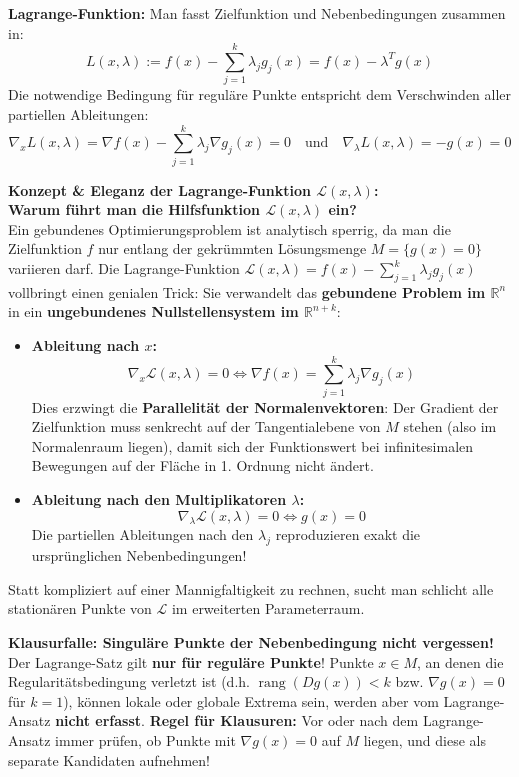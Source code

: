 \begin{definition}
    \textbf{Lagrange-Funktion:} Man fasst Zielfunktion und Nebenbedingungen zusammen in:
    $$ L(x, \lambda) := f(x) - \sum_{j=1}^k \lambda_j g_j(x) = f(x) - \lambda^T g(x) $$
    Die notwendige Bedingung für reguläre Punkte entspricht dem Verschwinden aller partiellen Ableitungen:
    $$ \nabla_x L(x, \lambda) = \nabla f(x) - \sum_{j=1}^k \lambda_j \nabla g_j(x) = 0 \quad \text{und} \quad \nabla_\lambda L(x, \lambda) = -g(x) = 0 $$
\end{definition}

\begin{remark}
    \textbf{Konzept \& Eleganz der Lagrange-Funktion $\mathcal{L}(x, \lambda)$:} \\
    \textbf{Warum führt man die Hilfsfunktion $\mathcal{L}(x, \lambda)$ ein?} \\
    Ein gebundenes Optimierungsproblem ist analytisch sperrig, da man die Zielfunktion $f$ nur entlang der gekrümmten Lösungsmenge $M = \{g(x) = 0\}$ variieren darf. Die Lagrange-Funktion $\mathcal{L}(x, \lambda) = f(x) - \sum_{j=1}^k \lambda_j g_j(x)$ vollbringt einen genialen Trick: Sie verwandelt das \textbf{gebundene Problem im $\mathbb{R}^n$} in ein \textbf{ungebundenes Nullstellensystem im $\mathbb{R}^{n+k}$}:
    \begin{itemize}
        \item \textbf{Ableitung nach $x$:}
        $$ \nabla_x \mathcal{L}(x, \lambda) = 0 \iff \nabla f(x) = \sum_{j=1}^k \lambda_j \nabla g_j(x) $$
        Dies erzwingt die \textbf{Parallelität der Normalenvektoren}: Der Gradient der Zielfunktion muss senkrecht auf der Tangentialebene von $M$ stehen (also im Normalenraum liegen), damit sich der Funktionswert bei infinitesimalen Bewegungen auf der Fläche in 1. Ordnung nicht ändert.
        \item \textbf{Ableitung nach den Multiplikatoren $\lambda$:}
        $$ \nabla_\lambda \mathcal{L}(x, \lambda) = 0 \iff g(x) = 0 $$
        Die partiellen Ableitungen nach den $\lambda_j$ reproduzieren exakt die ursprünglichen Nebenbedingungen!
    \end{itemize}
    Statt kompliziert auf einer Mannigfaltigkeit zu rechnen, sucht man schlicht alle stationären Punkte von $\mathcal{L}$ im erweiterten Parameterraum.
\end{remark}

\begin{remark}
    \textbf{Klausurfalle: Singuläre Punkte der Nebenbedingung nicht vergessen!}
    Der Lagrange-Satz gilt \textbf{nur für reguläre Punkte}! Punkte $x \in M$, an denen die Regularitätsbedingung verletzt ist (d.h. $\operatorname{rang}(Dg(x)) < k$ bzw. $\nabla g(x) = 0$ für $k=1$), können lokale oder globale Extrema sein, werden aber vom Lagrange-Ansatz \textbf{nicht erfasst}.
    \textbf{Regel für Klausuren:} Vor oder nach dem Lagrange-Ansatz immer prüfen, ob Punkte mit $\nabla g(x) = 0$ auf $M$ liegen, und diese als separate Kandidaten aufnehmen!
\end{remark}

